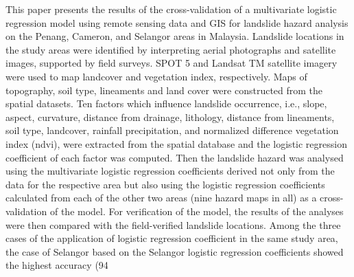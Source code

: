 This paper presents the results of the cross-validation of a multivariate logistic regression model using remote sensing data and GIS for landslide hazard analysis on the Penang, Cameron, and Selangor areas in Malaysia. Landslide locations in the study areas were identified by interpreting aerial photographs and satellite images, supported by field surveys. SPOT 5 and Landsat TM satellite imagery were used to map landcover and vegetation index, respectively. Maps of topography, soil type, lineaments and land cover were constructed from the spatial datasets. Ten factors which influence landslide occurrence, i.e., slope, aspect, curvature, distance from drainage, lithology, distance from lineaments, soil type, landcover, rainfall precipitation, and normalized difference vegetation index (ndvi), were extracted from the spatial database and the logistic regression coefficient of each factor was computed. Then the landslide hazard was analysed using the multivariate logistic regression coefficients derived not only from the data for the respective area but also using the logistic regression coefficients calculated from each of the other two areas (nine hazard maps in all) as a cross-validation of the model. For verification of the model, the results of the analyses were then compared with the field-verified landslide locations. Among the three cases of the application of logistic regression coefficient in the same study area, the case of Selangor based on the Selangor logistic regression coefficients showed the highest accuracy (94%